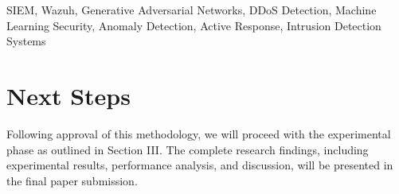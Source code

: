 \documentclass[conference]{IEEEtran}
\begin{document}
\pagestyle{fancy}
\fancyhf{}
\fancyfoot[R]{\thepage}
\renewcommand{\headrulewidth}{0pt}
\renewcommand{\footrulewidth}{0pt}





\begin{IEEEkeywords}
SIEM, Wazuh, Generative Adversarial Networks, DDoS Detection, Machine Learning Security, Anomaly Detection, Active Response, Intrusion Detection Systems
\end{IEEEkeywords}







\section*{Next Steps}

Following approval of this methodology, we will proceed with the experimental phase as outlined in Section III. The complete research findings, including experimental results, performance analysis, and discussion, will be presented in the final paper submission.




\end{document}

